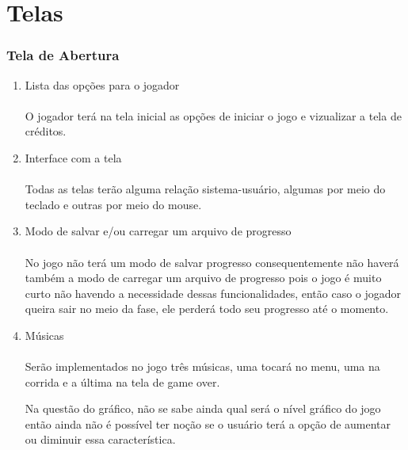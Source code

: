 \part{Telas}

\section{Tela de Abertura}

\begin{enumerate}

\item Lista das opções para o jogador \\\\
O jogador terá na tela inicial as opções de iniciar o jogo e vizualizar a tela de créditos. \\

\item Interface com a tela \\\\
Todas as telas terão alguma relação sistema-usuário, algumas por meio do teclado e outras por meio do mouse. \\

\item Modo de salvar e/ou carregar um arquivo de progresso \\\\
No jogo não terá um modo de salvar progresso consequentemente não haverá também a modo de carregar um arquivo de progresso pois o jogo é muito curto não havendo a necessidade dessas funcionalidades, então caso o jogador queira sair no meio da fase, ele perderá todo seu progresso até o momento. \\

\item Músicas \\\\
Serão implementados no jogo três músicas, uma tocará no menu, uma na corrida e a última na tela de game over.

Na questão do gráfico, não se sabe ainda qual será o nível gráfico do jogo então ainda não é possível ter noção se o usuário terá a opção de aumentar ou diminuir essa característica. \\

\end{enumerate}

